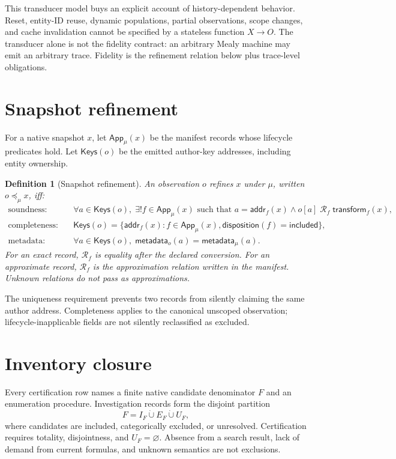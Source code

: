 \documentclass[11pt]{article}
\newtheorem{definition}{Definition}
\begin{document}
This transducer model buys an explicit account of history-dependent behavior.
Reset, entity-ID reuse, dynamic populations, partial observations, scope
changes, and cache invalidation cannot be specified by a stateless function
$X\to O$.  The transducer alone is not the fidelity contract: an arbitrary
Mealy machine may emit an arbitrary trace.  Fidelity is the refinement
relation below plus trace-level obligations.

\section{Snapshot refinement}

For a native snapshot $x$, let $\mathsf{App}_\mu(x)$ be the manifest records
whose lifecycle predicates hold.  Let $\mathsf{Keys}(o)$ be the emitted
author-key addresses, including entity ownership.

\begin{definition}[Snapshot refinement]
An observation $o$ refines $x$ under $\mu$, written $o\preceq_\mu x$, iff:
\begin{align}
  \text{soundness:}\quad
  &\forall a\in\mathsf{Keys}(o),\;\exists! f\in\mathsf{App}_\mu(x)
    \text{ such that }a=\mathsf{addr}_f(x)
    \land o[a]\;\mathcal{R}_f\;\mathsf{transform}_f(x), \\
  \text{completeness:}\quad
  &\mathsf{Keys}(o)=
    \{\mathsf{addr}_f(x):f\in\mathsf{App}_\mu(x),
      \mathsf{disposition}(f)=\mathsf{included}\}, \\
  \text{metadata:}\quad
  &\forall a\in\mathsf{Keys}(o),\;
    \mathsf{metadata}_o(a)=\mathsf{metadata}_\mu(a).
\end{align}
For an exact record, $\mathcal{R}_f$ is equality after the declared conversion.
For an approximate record, $\mathcal{R}_f$ is the approximation relation
written in the manifest.  Unknown relations do not pass as approximations.
\end{definition}

The uniqueness requirement prevents two records from silently claiming the
same author address.  Completeness applies to the canonical unscoped
observation; lifecycle-inapplicable fields are not silently reclassified as
excluded.

\section{Inventory closure}

Every certification row names a finite native candidate denominator $F$ and
an enumeration procedure.  Investigation records form the disjoint partition
\[
  F = I_F\mathbin{\dot\cup}E_F\mathbin{\dot\cup}U_F,
\]
where candidates are included, categorically excluded, or unresolved.
Certification requires totality, disjointness, and $U_F=\varnothing$.
Absence from a search result, lack of demand from current formulas, and
unknown semantics are not exclusions.
\end{document}

